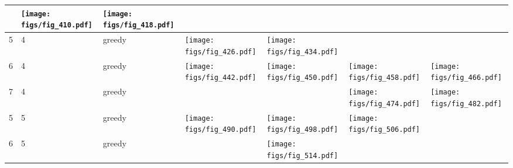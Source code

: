 \documentclass[oneside,canadian,landscape]{article}
\begin{document}
\begin{center}
\begin{longtable}{|l|l|l||l|l|l|l|}
&\begin{minipage}{3.5cm}
\texttt{[image: figs/fig\_410.pdf]}
\end{minipage}
&\begin{minipage}{3.5cm}
\texttt{[image: figs/fig\_418.pdf]}
\end{minipage}
\\ \hline
5&4&greedy&\begin{minipage}{3.5cm}
\texttt{[image: figs/fig\_426.pdf]}
\end{minipage}
&\begin{minipage}{3.5cm}
\texttt{[image: figs/fig\_434.pdf]}
\end{minipage}
&&\\ \hline
6&4&greedy&\begin{minipage}{3.5cm}
\texttt{[image: figs/fig\_442.pdf]}
\end{minipage}
&\begin{minipage}{3.5cm}
\texttt{[image: figs/fig\_450.pdf]}
\end{minipage}
&\begin{minipage}{3.5cm}
\texttt{[image: figs/fig\_458.pdf]}
\end{minipage}
&\begin{minipage}{3.5cm}
\texttt{[image: figs/fig\_466.pdf]}
\end{minipage}
\\ \hline
7&4&greedy&&&\begin{minipage}{3.5cm}
\texttt{[image: figs/fig\_474.pdf]}
\end{minipage}
&\begin{minipage}{3.5cm}
\texttt{[image: figs/fig\_482.pdf]}
\end{minipage}
\\ \hline
5&5&greedy&\begin{minipage}{3.5cm}
\texttt{[image: figs/fig\_490.pdf]}
\end{minipage}
&\begin{minipage}{3.5cm}
\texttt{[image: figs/fig\_498.pdf]}
\end{minipage}
&\begin{minipage}{3.5cm}
\texttt{[image: figs/fig\_506.pdf]}
\end{minipage}
&\\ \hline
6&5&greedy&&\begin{minipage}{3.5cm}
\texttt{[image: figs/fig\_514.pdf]}

\end{minipage}
\end{longtable}
\end{center}
\end{document}
